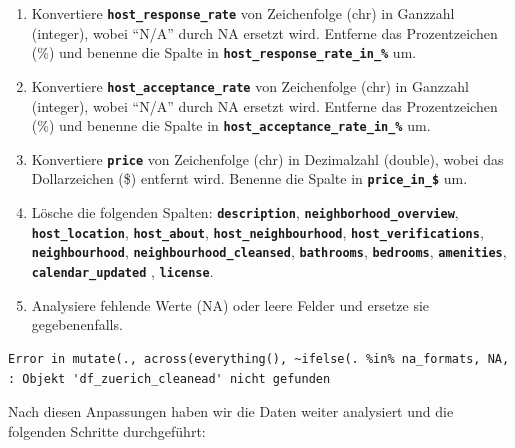 \documentclass[
  journal,
]{IEEEtran}%
\begin{document}
\begin{enumerate}
\def\labelenumi{\arabic{enumi}.}
\item
  Konvertiere \textbf{\texttt{host\_response\_rate}} von Zeichenfolge
  (chr) in Ganzzahl (integer), wobei ``N/A'' durch NA ersetzt wird.
  Entferne das Prozentzeichen (\%) und benenne die Spalte in
  \textbf{\texttt{host\_response\_rate\_in\_\%}} um.
\item
  Konvertiere \textbf{\texttt{host\_acceptance\_rate}} von Zeichenfolge
  (chr) in Ganzzahl (integer), wobei ``N/A'' durch NA ersetzt wird.
  Entferne das Prozentzeichen (\%) und benenne die Spalte in
  \textbf{\texttt{host\_acceptance\_rate\_in\_\%}} um.
\item
  Konvertiere \textbf{\texttt{price}} von Zeichenfolge (chr) in
  Dezimalzahl (double), wobei das Dollarzeichen (\$) entfernt wird.
  Benenne die Spalte in \textbf{\texttt{price\_in\_\$}} um.
\item
  Lösche die folgenden Spalten: \textbf{\texttt{description}},
  \textbf{\texttt{neighborhood\_overview}},
  \textbf{\texttt{host\_location}}, \textbf{\texttt{host\_about}},
  \textbf{\texttt{host\_neighbourhood}},
  \textbf{\texttt{host\_verifications}},
  \textbf{\texttt{neighbourhood}},
  \textbf{\texttt{neighbourhood\_cleansed}},
  \textbf{\texttt{bathrooms}}, \textbf{\texttt{bedrooms}},
  \textbf{\texttt{amenities}}, \textbf{\texttt{calendar\_updated}} ,
  \textbf{\texttt{license}}.
\item
  Analysiere fehlende Werte (NA) oder leere Felder und ersetze sie
  gegebenenfalls.
\end{enumerate}

\begin{verbatim}
Error in mutate(., across(everything(), ~ifelse(. %in% na_formats, NA, : Objekt 'df_zuerich_cleanead' nicht gefunden
\end{verbatim}

Nach diesen Anpassungen haben wir die Daten weiter analysiert und die
folgenden Schritte durchgeführt:
\end{document}
